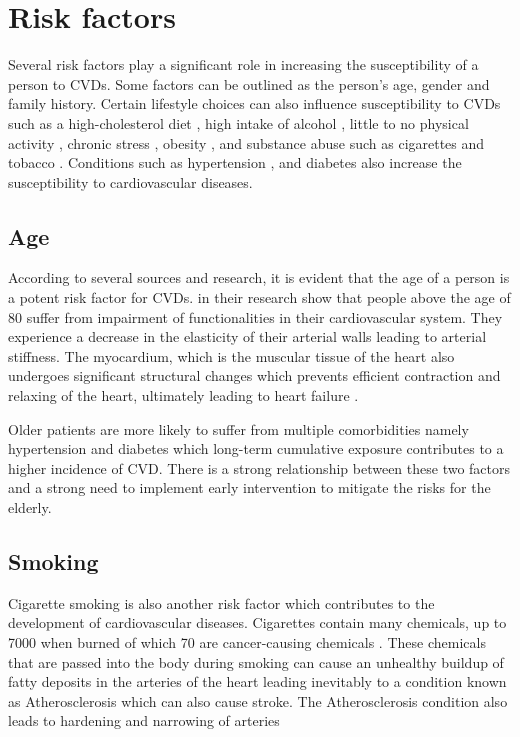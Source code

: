 \documentclass[12pt, a4paper,twoside]{report}
\numberwithin{equation}{chapter}
\begin{document}
\section{Risk factors}
Several risk factors play a significant role in increasing the susceptibility of a person to CVDs. Some factors can be outlined as the person's age, gender and family history. Certain lifestyle choices can also influence susceptibility to CVDs such as a high-cholesterol diet \parencite{Actrn2019}, high intake of alcohol \parencite{Tegegne2022}, little to no physical activity \parencite{Mangione2022}, chronic stress \parencite{An2016}, obesity \parencite{lopez2022}, and substance abuse such as cigarettes and tobacco \parencite{Salahuddin2012}. Conditions such as hypertension \parencite{Wang2020}, and diabetes \parencite{Kilkenny2017} also increase the susceptibility to cardiovascular diseases.

\subsection{Age}
According to several sources and research, it is evident that the age of a person is a potent risk factor for CVDs. \parencite{curtis2018arrhythmias} in their research show that people above the age of 80 suffer from impairment of functionalities in their cardiovascular system. They experience a decrease in the elasticity of their arterial walls leading to arterial stiffness. The myocardium, which is the muscular tissue of the heart also undergoes significant structural changes \parencite{Ribeiro2023} which prevents efficient contraction and relaxing of the heart, ultimately leading to heart failure \parencite{Tromp2021}.

Older patients are more likely to suffer from multiple comorbidities namely hypertension and diabetes which long-term cumulative exposure contributes to a higher incidence of CVD. There is a strong relationship between these two factors and a strong need to implement early intervention to mitigate the risks for the elderly.

\subsection{Smoking}

Cigarette smoking is also another risk factor which contributes to the development of cardiovascular diseases. Cigarettes contain many chemicals, up to 7000 when burned \parencite{ALA} of which 70 are cancer-causing chemicals \parencite{ALA, CANCERGOV}. These chemicals that are passed into the body during smoking can cause an unhealthy buildup of fatty deposits in the arteries of the heart leading inevitably to a condition known as Atherosclerosis \parencite{Rafieian-Kopaei2014, Salehi2021} which can also cause stroke. The Atherosclerosis condition also leads to hardening and narrowing of arteries \parencite{Australia}
\end{document}
